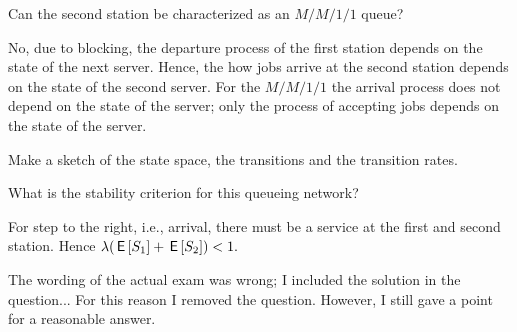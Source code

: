 
\begin{exercise}[201706]
  Can the second station be characterized as an $M/M/1/1$ queue? 
\begin{solution}
    No, due to blocking, the departure process of the first station depends on the state of the next server. Hence, the how  jobs arrive at the second station depends on the state of the second server. For the $M/M/1/1$ the arrival process does not depend on the state of the server; only the process of accepting jobs depends on the state of the server.  
\end{solution}
\end{exercise}


\begin{exercise}[201706]
Make a sketch of the state space,  the transitions and the transition rates.
\begin{solution}
  \begin{center}
    
  \end{center}
\end{solution}
\end{exercise}

\begin{exercise}[201706]
What is the stability criterion for  this queueing network?
\begin{solution}
For step to the right, i.e., arrival, there must be a service at the first and second station. Hence $\lambda (\,\mathsf{E}\left[S_1\right] + \,\mathsf{E}\left[S_2\right] )  < 1.$ 

The wording of the actual exam was wrong; I included the solution in the question... For this reason I removed the question. However, I still gave a point for a reasonable answer. 
\end{solution}
\end{exercise}

